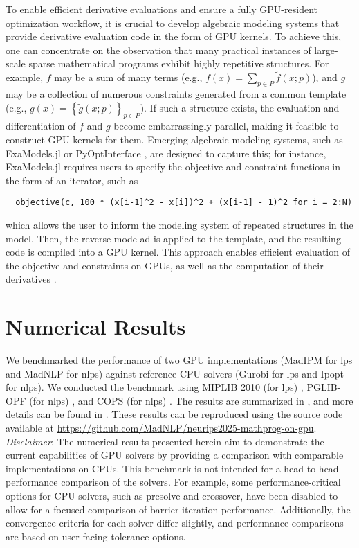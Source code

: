 \documentclass{article}
\begin{document}
To enable efficient derivative evaluations and ensure a fully GPU-resident optimization workflow, it is crucial to develop algebraic modeling systems that provide derivative evaluation code in the form of GPU kernels. To achieve this, one can concentrate on the observation that many practical instances of large-scale sparse mathematical programs exhibit highly repetitive structures. For example, $f$ may be a sum of many terms (e.g., $f(x) = \sum_{p\in P} \widetilde{f}(x; p)$), and $g$ may be a collection of numerous constraints generated from a common template (e.g., $g(x) = \left\{\widetilde{g}(x; p)\right\}_{p\in P}$). If such a structure exists, the evaluation and differentiation of $f$ and $g$ become embarrassingly parallel, making it feasible to construct GPU kernels for them. Emerging algebraic modeling systems, such as ExaModels.jl \cite{shinAcceleratingOptimalPower2024} or PyOptInterface \cite{yangPyOptInterfaceDesignImplementation2024}, are designed to capture this; for instance, ExaModels.jl requires users to specify the objective and constraint functions in the form of an iterator, such as
\begin{verbatim}
  objective(c, 100 * (x[i-1]^2 - x[i])^2 + (x[i-1] - 1)^2 for i = 2:N)
\end{verbatim}
which allows the user to inform the modeling system of repeated structures in the model. Then, the reverse-mode \gls*{ad} is applied to the template, and the resulting code is compiled into a GPU kernel. This approach enables efficient evaluation of the objective and constraints on GPUs, as well as the computation of their derivatives \cite{shinAcceleratingOptimalPower2024}.




\section{Numerical Results}\label{eqn:num}
We benchmarked the performance of two GPU implementations (MadIPM for \glspl*{lp} and MadNLP for \glspl*{nlp}) against reference CPU solvers (Gurobi for \glspl*{lp} and Ipopt for \glspl*{nlp}). We conducted the benchmark using MIPLIB 2010 (for \glspl*{lp}) \cite{kochMIPLIB20102011}, PGLIB-OPF (for \glspl*{nlp}) \cite{babaeinejadsarookolaeePowerGridLibrary2021}, and COPS (for \glspl*{nlp}) \cite{dolanBenchmarkingOptimizationSoftware2001}. The results are summarized in , and more details can be found in . These results can be reproduced using the source code available at \url{https://github.com/MadNLP/neurips2025-mathprog-on-gpu}. \textit{Disclaimer}: The numerical results presented herein aim to demonstrate the current capabilities of GPU solvers by providing a comparison with comparable implementations on CPUs. This benchmark is not intended for a head-to-head performance comparison of the solvers. For example, some performance-critical options for CPU solvers, such as presolve and crossover, have been disabled to allow for a focused comparison of barrier iteration performance. Additionally, the convergence criteria for each solver differ slightly, and performance comparisons are based on user-facing tolerance options.
\end{document}
